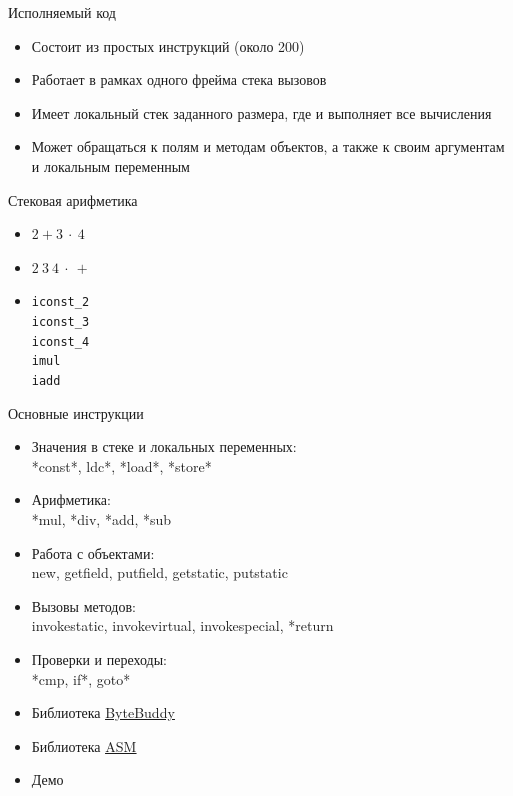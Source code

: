 \documentclass[unicode]{beamer}
\begin{document}
\begin{frame}{Исполняемый код}
\begin{itemize}
\item Состоит из простых инструкций (около 200)
\item Работает в рамках одного фрейма стека вызовов
\item Имеет локальный стек заданного размера,
    где и выполняет все вычисления
\item Может обращаться к полям и методам объектов,
    а также к своим аргументам и локальным переменным
\end{itemize}
\end{frame}


\begin{frame}{Стековая арифметика}
\begin{itemize}
\item $2+3\ \cdot\ 4$
\item $2\ 3\ 4\ \cdot\ +$
\item \texttt{iconst\_2}\\
      \texttt{iconst\_3}\\
      \texttt{iconst\_4}\\
      \texttt{imul}\\
      \texttt{iadd}
\end{itemize}
\end{frame}


\begin{frame}{Основные инструкции}
\begin{itemize}
\item Значения в стеке и локальных переменных:\\
*const*, ldc*, *load*, *store*
\item Арифметика:\\
*mul, *div, *add, *sub
\item Работа с объектами:\\
new, getfield, putfield, getstatic, putstatic
\item Вызовы методов:\\
invokestatic, invokevirtual, invokespecial, *return
\item Проверки и переходы:\\
*cmp, if*, goto*
\end{itemize}
\end{frame}


\begin{frame}
\begin{itemize}
\item Библиотека \underline{\href{http://bytebuddy.net/}{ByteBuddy}}
    \bigskip

\item Библиотека \underline{\href{http://asm.ow2.org/}{ASM}}
    \bigskip

\item Демо
\end{itemize}
\end{frame}
\end{document}
